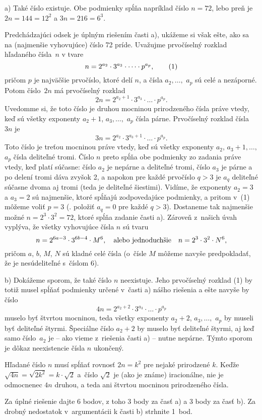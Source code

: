 {%
a) Také číslo existuje. Obe podmienky spĺňa napríklad číslo
$n=72$, lebo preň je $2n=144=12^2$ a $3n=216=6^3$.

Predchádzajúci odsek je úplným riešením časti a), ukážeme si
však ešte, ako sa na (najmenšie vyhovujúce) číslo 72 príde.
Uvažujme prvočíselný rozklad hľadaného čísla~$n$ v tvare
$$
n=2^{a_2}\cdot 3^{a_3}\cdot\dots\cdot p^{a_p},
\tag1$$
pričom $p$ je najväčšie prvočíslo, ktoré delí $n$, a čísla
$a_2, \dots,$ $a_p$ sú celé a nezáporné. Potom číslo~$2n$ má
prvočíselný rozklad
$$
2n = 2^{a_2+1}\cdot 3^{a_3}\cdot\dots\cdot p^{a_p}.
$$
Uvedomme si, že toto číslo je druhou mocninou prirodzeného čísla
práve vtedy, keď sú všetky exponenty $a_2+1$, $a_3,
\dots,$ $a_p$ čísla párne. Prvočíselný rozklad čísla $3n$ je
$$
3n=2^{a_2}\cdot 3^{a_3+1}\cdot\dots\cdot p^{a_p}.
$$
Toto číslo je treťou mocninou práve vtedy, keď sú všetky
exponenty $a_2$, $a_3+1,\dots,$ $a_p$ čísla deliteľné
tromi. Číslo $n$ preto spĺňa obe podmienky zo zadania
práve vtedy, keď platí súčasne: číslo $a_2$ je nepárne a deliteľné tromi,
číslo $a_3$ je párne a po delení tromi dáva zvyšok 2, a napokon
pre každé prvočíslo $q>3$ je $a_q$ deliteľné súčasne dvoma aj tromi
(teda je deliteľné šiestimi). Vidíme, že exponenty $a_2=3$ a $a_3=2$
sú najmenšie, ktoré spĺňajú zodpovedajúce podmienky, a pritom v~(1)
môžeme voliť $p=3$ (\tj. položiť $a_q=0$ pre každé $q>3$).
Dostaneme tak
najmenšie možné $n=2^3\cdot 3^2=72$, ktoré spĺňa zadanie časti a).
Zároveň z~našich úvah vyplýva, že všetky vyhovujúce čísla $n$
sú tvaru
$$
n=2^{6a-3}\cdot 3^{6b-4}\cdot M^6,\quad\hbox{alebo jednoduchšie}\quad
n=2^{3}\cdot 3^{2}\cdot N^6,
$$
pričom $a$, $b$, $M$, $N$ sú kladné celé čísla (o~čísle $M$ môžeme
navyše predpokladať, že je nesúdeliteľné s~číslom 6).

\medskip
b) Dokážeme sporom, že také číslo $n$ neexistuje. Jeho
prvočíselný rozklad (1) by totiž musel spĺňať podmienky
určené v~časti a) nášho riešenia a ešte navyše by číslo
$$
4n=2^{a_2+2}\cdot 3^{a_3}\cdot\dots\cdot p^{a_p}
$$
muselo byť štvrtou mocninou, teda všetky exponenty
$a_2+2$, $a_3,\dots,$ $a_p$ by museli byť deliteľné štyrmi.
Špeciálne číslo $a_2+2$ by muselo byť deliteľné štyrmi, aj keď
samo číslo~$a_2$ je -- ako vieme z~riešenia časti a) -- nutne nepárne.
Týmto sporom je dôkaz neexistencie čísla $n$ ukončený.

Hľadané číslo $n$ musí spĺňať rovnosť $2n=k^2$
pre nejaké prirodzené $k$. Keďže $\sqrt{4n}=\sqrt{2k^2}=k\cdot\sqrt{2}$
a~číslo $\sqrt{2}$ je (ako je známe) iracionálne, nie je odmocnenec $4n$
druhou, a teda ani štvrtou mocninou prirodzeného čísla.

\schemaABC
Za úplné riešenie dajte 6 bodov, z toho 3 body za časť a) a
3 body za časť b). Za drobný nedostatok v~argumentácii k časti b)
strhnite 1~bod.
\endschema
}

